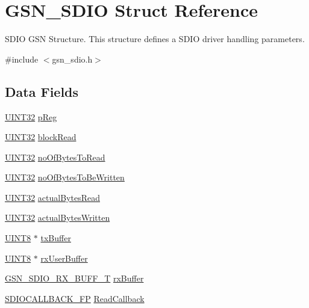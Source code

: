 \hypertarget{a00216}{
\section{GSN\_\-SDIO Struct Reference}
\label{a00216}
}


SDIO GSN Structure. This structure defines a SDIO driver handling parameters.  




{\ttfamily \#include $<$gsn\_\-sdio.h$>$}

\subsection*{Data Fields}
\begin{DoxyCompactItemize}
\item 
\hyperlink{a00660_gae1e6edbbc26d6fbc71a90190d0266018}{UINT32} \hyperlink{a00216_a733fb7afbc3bd37a546de0e37c12f150}{pReg}
\item 
\hyperlink{a00660_gae1e6edbbc26d6fbc71a90190d0266018}{UINT32} \hyperlink{a00216_ae1125ef709bd2329399f5350bc6968de}{blockRead}
\item 
\hyperlink{a00660_gae1e6edbbc26d6fbc71a90190d0266018}{UINT32} \hyperlink{a00216_a96ecaff82c1cc0fe60c48e5eb2b2e471}{noOfBytesToRead}
\item 
\hyperlink{a00660_gae1e6edbbc26d6fbc71a90190d0266018}{UINT32} \hyperlink{a00216_ae09323dd91f7fb30eeaa3d7e3ec1c2a8}{noOfBytesToBeWritten}
\item 
\hyperlink{a00660_gae1e6edbbc26d6fbc71a90190d0266018}{UINT32} \hyperlink{a00216_a2bbf2fcbc8e54eea4413aa5214f4e0aa}{actualBytesRead}
\item 
\hyperlink{a00660_gae1e6edbbc26d6fbc71a90190d0266018}{UINT32} \hyperlink{a00216_acaadb3f45d67507c5f8f58ab6df0a970}{actualBytesWritten}
\item 
\hyperlink{a00660_gab27e9918b538ce9d8ca692479b375b6a}{UINT8} $\ast$ \hyperlink{a00216_aaa16ff66d9982ada7aebae8e16dd1579}{txBuffer}
\item 
\hyperlink{a00660_gab27e9918b538ce9d8ca692479b375b6a}{UINT8} $\ast$ \hyperlink{a00216_ab193a10d1ff3641a6f7675c7f15b1fd5}{rxUserBuffer}
\item 
\hyperlink{a00225}{GSN\_\-SDIO\_\-RX\_\-BUFF\_\-T} \hyperlink{a00216_ab33acc5a2a02cec5e984720d9be033c6}{rxBuffer}
\item 
\hyperlink{a00584_ac80005f1e9ff1e1e884583938336474b}{SDIOCALLBACK\_\-FP} \hyperlink{a00216_a13c6299f64f8152d048be374004adc1d}{ReadCallback}
\item 

\end{DoxyCompactItemize}
